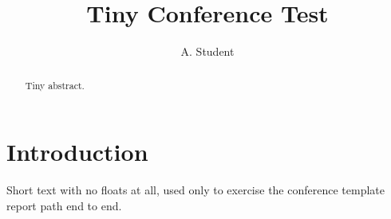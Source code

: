 \documentclass[11pt,letterpaper]{article}
\title{Tiny Conference Test}
\author{A. Student}
\begin{document}
\maketitle
\begin{abstract}Tiny abstract.\end{abstract}
\section{Introduction}
Short text with no floats at all, used only to exercise the conference
template report path end to end.
\end{document}
